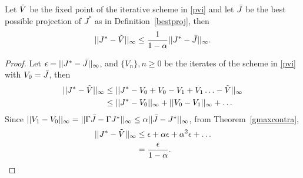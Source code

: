 \begin{theorem}\label{fxpres}
Let $\tilde{V}$ be the fixed point of the iterative scheme in \eqref{pvi} and let $\bar{J}$ be the best possible projection of $J^*$ as in Definition~\ref{bestproj}, then
\begin{align}
||J^*-\tilde{V}||_\infty\leq \frac{1}{1-\alpha}||J^*-\bar{J}||_\infty.
\end{align}
\end{theorem}
\begin{proof}
Let $\epsilon=||J^*-\bar{J}||_\infty$, and $\{V_n\},n\geq 0$ be the iterates of the scheme in \eqref{pvi} with $V_0=\bar{J}$, then
\begin{align}
||J^*-\tilde{V}||_\infty&\leq ||J^*-V_0+V_0-V_1+V_1\ldots-\tilde{V}||_\infty\nonumber\\
&\leq ||J^*-V_0||_\infty+||V_0-V_1||_\infty+\ldots\nonumber
\end{align}
Since $||V_1-V_0||_\infty=||\Gamma \bar{J}-\Gamma J^*||_\infty\leq\alpha||\bar{J}-J^*||_\infty$, from Theorem~\ref{gmaxcontra},
\begin{align}
||J^*-\tilde{V}||_\infty&\leq \epsilon+\alpha\epsilon+\alpha^2\epsilon+\ldots\nonumber\\
&=\frac{\epsilon}{1-\alpha}.
\end{align}
\end{proof}

